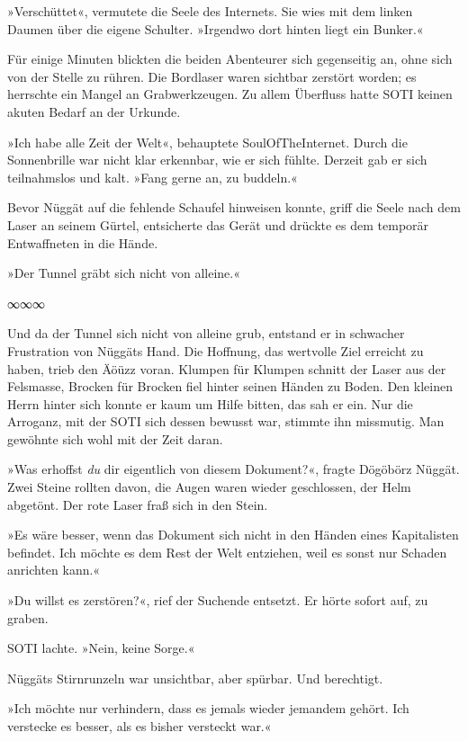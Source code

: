 »Verschüttet«, vermutete die Seele des Internets. Sie wies mit dem linken Daumen über die eigene Schulter. »Irgendwo dort hinten liegt ein Bunker.«

Für einige Minuten blickten die beiden Abenteurer sich gegenseitig an, ohne sich von der Stelle zu rühren. Die Bordlaser waren sichtbar zerstört worden; es herrschte ein Mangel an Grabwerkzeugen. Zu allem Überfluss hatte SOTI keinen akuten Bedarf an der Urkunde.

»Ich habe alle Zeit der Welt«, behauptete SoulOfTheInternet. Durch die Sonnenbrille war nicht klar erkennbar, wie er sich fühlte. Derzeit gab er sich teilnahmslos und kalt. »Fang gerne an, zu buddeln.«

Bevor Nüggät auf die fehlende Schaufel hinweisen konnte, griff die Seele nach dem Laser an seinem Gürtel, entsicherte das Gerät und drückte es dem temporär Entwaffneten in die Hände.

»Der Tunnel gräbt sich nicht von alleine.«

\begin{center}
∞∞∞
\end{center}

Und da der Tunnel sich nicht von alleine grub, entstand er in schwacher Frustration von Nüggäts Hand. Die Hoffnung, das wertvolle Ziel erreicht zu haben, trieb den Äöüzz voran. Klumpen für Klumpen schnitt der Laser aus der Felsmasse, Brocken für Brocken fiel hinter seinen Händen zu Boden. Den kleinen Herrn hinter sich konnte er kaum um Hilfe bitten, das sah er ein. Nur die Arroganz, mit der SOTI sich dessen bewusst war, stimmte ihn missmutig. Man gewöhnte sich wohl mit der Zeit daran.

»Was erhoffst \emph{du} dir eigentlich von diesem Dokument?«, fragte Dögöbörz Nüggät. Zwei Steine rollten davon, die Augen waren wieder geschlossen, der Helm abgetönt. Der rote Laser fraß sich in den Stein.

»Es wäre besser, wenn das Dokument sich nicht in den Händen eines Kapitalisten befindet. Ich möchte es dem Rest der Welt entziehen, weil es sonst nur Schaden anrichten kann.«

»Du willst es zerstören?«, rief der Suchende entsetzt. Er hörte sofort auf, zu graben.

SOTI lachte. »Nein, keine Sorge.«

Nüggäts Stirnrunzeln war unsichtbar, aber spürbar. Und berechtigt.

»Ich möchte nur verhindern, dass es jemals wieder jemandem gehört. Ich verstecke es besser, als es bisher versteckt war.«

